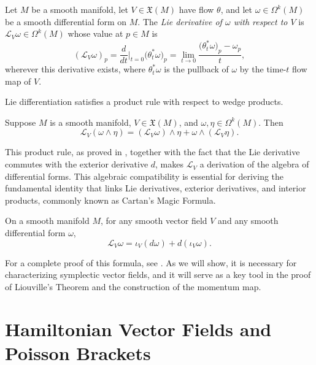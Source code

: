 \begin{definition}
	Let $M$ be a smooth manifold, let $V \in \mathfrak{X}(M)$ have flow $\theta$, and let $\omega \in \Omega^k(M)$ be a smooth differential form on $M$. The \emph{Lie derivative of $\omega$ with respect to $V$} is $\mathscr{L}_V\omega \in \Omega^k(M)$ whose value at $p \in M$ is
	\[
	(\mathscr{L}_V\omega)_p = \frac{d}{dt}\Big|_{t=0} \big(\theta_t^*\omega\big)_p = \lim_{t\to 0} \frac{\big(\theta_t^*\omega\big)_p - \omega_p}{t},
	\]
	wherever this derivative exists, where $\theta_t^*\omega$ is the pullback of $\omega$ by the time-$t$ flow map of $V$.
\end{definition}

Lie differentiation satisfies a product rule with respect to wedge products.

\begin{proposition}
	Suppose $M$ is a smooth manifold, $V \in \mathfrak{X}(M)$, and $\omega, \eta \in \Omega^k(M)$. Then
	\[
	\mathscr{L}_V(\omega \wedge \eta) = (\mathscr{L}_V\omega) \wedge \eta + \omega \wedge (\mathscr{L}_V\eta).
	\]
\end{proposition}

This product rule, as proved in \cite[Proposition 14.33]{leeIntroductionSmoothManifolds2013}, together with the fact that the Lie derivative commutes with the exterior derivative $d$, makes $\mathscr{L}_V$ a derivation of the algebra of differential forms. This algebraic compatibility is essential for deriving the fundamental identity that links Lie derivatives, exterior derivatives, and interior products, commonly known as Cartan's Magic Formula. 

\begin{theorem}\label{thm:cartan}
	On a smooth manifold $M$, for any smooth vector field $V$ and any smooth differential form $\omega$,
	\begin{equation}
		\mathscr{L}_V\omega = \iota_V(d\omega) + d(\iota_V\omega).
	\end{equation}
\end{theorem}

For a complete proof of this formula, see \cite[Theorem 14.35]{leeIntroductionSmoothManifolds2013}. As we will show, it is necessary for characterizing symplectic vector fields, and it will serve as a key tool in the proof of Liouville's Theorem and the construction of the momentum map.

\setcounter{section}{3}
\section{Hamiltonian Vector Fields and Poisson Brackets}


